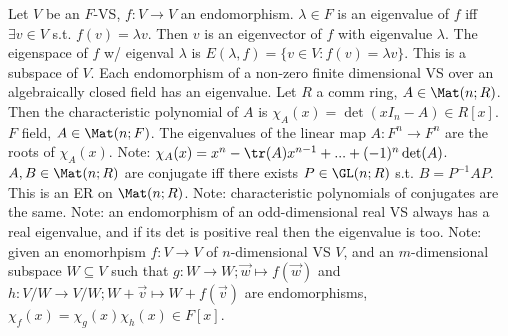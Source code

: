Let $V$ be an $F$-VS, $f: V \to V$ an endomorphism. $\lambda \in F$ is an eigenvalue of $f$ iff
$\exists v \in V$ s.t. $f(v) = \lambda v$. Then $v$ is an eigenvector of $f$ with eigenvalue $\lambda$.
The eigenspace of $f$ w/ eigenval $\lambda$ is $E(\lambda, f) = \{v \in V : f(v) = \lambda v\}$.
This is a subspace of $V$.
Each endomorphism of a non-zero finite dimensional VS over an algebraically closed field has an eigenvalue.
Let $R$ a comm ring, $A \in \Mat(n; R)$.
Then the characteristic polynomial of $A$ is $\chi_A(x) = \det(xI_n - A) \in R[x]$.
$F$ field, $A \in \Mat(n; F)$.
The eigenvalues of the linear map $A : F^n \to F^n$ are the roots of $\chi_A(x)$.
Note: $\chi_A(x) = x^n - \tr(A)x^{n-1} + ... + (-1)^n \det(A)$.
$A, B \in \Mat(n; R)$ are conjugate iff there exists $P \in \GL(n; R)$ s.t. $B = P^{-1}AP$.
This is an ER on $\Mat(n; R)$.
Note: characteristic polynomials of conjugates are the same.
Note: an endomorphism of an odd-dimensional real VS always has a real eigenvalue,
and if its det is positive real then the eigenvalue is too.
Note: given an enomorhpism $f : V \to V$ of $n$-dimensional VS $V$, and an $m$-dimensional subspace $W \subseteq V$  such that $g : W \rightarrow W; \vec{w} \mapsto f(\vec{w})$ and $h : V/W \rightarrow V/W; W + \vec{v} \mapsto W + f(\vec{v})$ are endomorphisms, $\chi_f(x) = \chi_g(x)\chi_h(x) \in F[x]$.